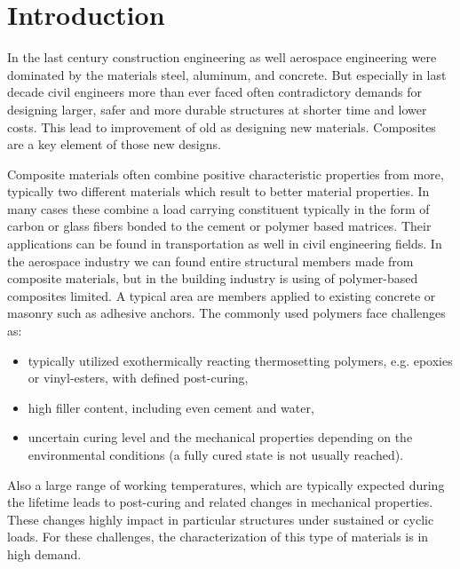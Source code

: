 
\mbox{}
\thispagestyle{empty}
\clearpage

\section{Introduction}

In the last century construction engineering as well aerospace engineering  were dominated by the materials steel, aluminum, and concrete. But especially in last decade civil engineers more than ever faced often contradictory demands for designing larger, safer and more durable structures at shorter time and lower costs. This lead to improvement of old as designing new materials. Composites are a key element of those new designs. 

Composite materials often combine positive characteristic properties from more, typically two different materials which result to better material properties. In many cases these combine a load carrying constituent typically in the form of carbon or glass fibers bonded to the cement or polymer based matrices. Their applications can be found in transportation as well in civil engineering fields. In the aerospace industry we can found entire structural members made from composite materials, but in the building industry is using of polymer-based composites limited. A typical area are members applied to existing concrete or masonry such as adhesive anchors. The commonly used polymers face challenges as:

\begin{itemize}
	\item typically utilized exothermically reacting thermosetting polymers, e.g. epoxies or vinyl-esters, with defined post-curing,
	\item high filler content, including even cement and water,
	\item uncertain curing level and the mechanical properties depending on the environmental conditions (a fully cured state is not usually reached).
\end{itemize} 

Also a large range of working temperatures, which are typically expected during the lifetime leads to post-curing and related changes in mechanical properties. These changes highly impact in particular structures under sustained or cyclic loads. For these challenges, the characterization of this type of materials is in high demand.  